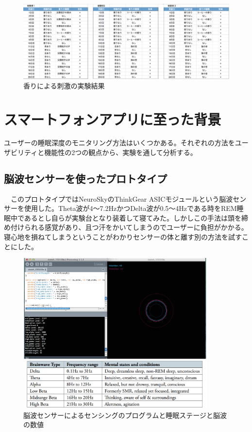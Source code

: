 \begin{figure}[htbp]
\begin{center}
\includegraphics[width=15cm]{eps/smellExperiment.eps}
\caption{香りによる刺激の実験結果}
\label{smellExperiment}
\end{center}
\end{figure}

\section{スマートフォンアプリに至った背景}
ユーザーの睡眠深度のモニタリング方法はいくつかある。それぞれの方法をユーザビリティと機能性の2つの観点から、実験を通して分析する。

\subsection{脳波センサーを使ったプロトタイプ}
　このプロトタイプではNeuroSkyのThinkGear ASICモジュールという脳波センサーを使用した。Theta波が4〜7.2HzかつDelta波が0.5〜4Hzである時をREM睡眠中であるとし自らが実験台となり装着して寝てみた。しかしこの手法は頭を締め付けられる感覚があり、且つ汗をかいてしまうのでユーザーに負担がかかる。寝心地を損ねてしまうということがわかりセンサーの体と離す別の方法を試すことにした。
\begin{figure}[htbp]
\begin{center}
\includegraphics[width=10cm]{eps/brainWave.eps}
\caption{脳波センサーによるセンシングのプログラムと睡眠ステージと脳波の数値}
\label{brainWave}
\end{center}
\end{figure}

